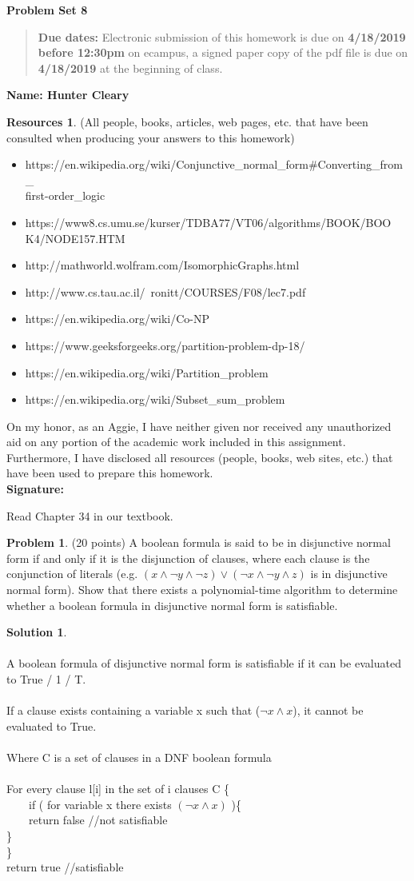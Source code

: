 \documentclass{article}
\theoremstyle{definition}
\newtheorem{problem}{Problem}
\newtheorem*{solution}{Solution}
\newtheorem*{resources}{Resources}
\newcommand{\name}[1]{\noindent\textbf{Name: #1}}
\newcommand{\honor}{\noindent On my honor, as an Aggie, I have neither
  given nor received any unauthorized aid on any portion of the
  academic work included in this assignment. Furthermore, I have
  disclosed all resources (people, books, web sites, etc.) that have
  been used to prepare this homework. \\[1ex]
 \textbf{Signature:} \underline{\hspace*{5cm}} }
\newcommand{\problemset}[1]{\begin{center}\textbf{Problem Set #1}\end{center}}
\newcommand{\duedate}[2]{\begin{quote}\textbf{Due dates:} Electronic
    submission of this homework is due on \textbf{#1} on ecampus, a
    signed paper copy of the pdf file is due on \textbf{#2} at the
    beginning of class. \end{quote} }
\begin{document}
\problemset{8}
\duedate{4/18/2019 before 12:30pm}{4/18/2019}
\name{ Hunter Cleary }
\begin{resources} (All people, books, articles, web pages, etc. that
  have been consulted when producing your answers to this homework)
  \begin{itemize}
      \item https://en.wikipedia.org/wiki/Conjunctive\_normal\_form#Converting\_from\_\\first-order\_logic
      \item https://www8.cs.umu.se/kurser/TDBA77/VT06/algorithms/BOOK/BOO\\K4/NODE157.HTM
      \item http://mathworld.wolfram.com/IsomorphicGraphs.html
      \item http://www.cs.tau.ac.il/~ronitt/COURSES/F08/lec7.pdf
      \item https://en.wikipedia.org/wiki/Co-NP
      \item https://www.geeksforgeeks.org/partition-problem-dp-18/
      \item https://en.wikipedia.org/wiki/Partition\_problem
      \item https://en.wikipedia.org/wiki/Subset\_sum\_problem
  \end{itemize}
\end{resources}
\honor

\newpage

Read Chapter 34 in our textbook. 

\begin{problem} (20 points) %
A boolean formula is said to be in disjunctive normal form if and only
if it is the disjunction of clauses, where each clause is the
conjunction of literals (e.g. $(x \wedge \neg y\wedge \neg z) \vee (\neg
x \wedge \neg y \wedge z)$ is in disjunctive normal form). 
Show that there exists a polynomial-time algorithm to determine
whether a boolean formula in disjunctive normal form is satisfiable. 
\end{problem}
\begin{solution} \\
\\
A boolean formula of disjunctive normal form is satisfiable if it can be evaluated to True / 1 / T.\\
\\
If a clause exists containing a variable x such that ($\neg x \wedge x$), it cannot be evaluated to True.\\
\\
Where C is a set of clauses in a DNF boolean formula\\
\\
For every clause l[i] in the set of i clauses C \{ \\
\indent \ \ \ \ if ( for variable x there exists $(\neg x \wedge x)$ )\{\\
\indent \indent \ \ \ \ return false //not satisfiable \\
\indent \indent \}\\
\indent \}\\
\indent return true //satisfiable\\


\end{solution}
\end{document}
